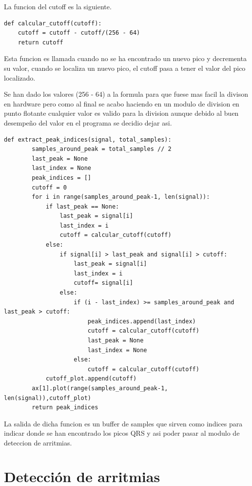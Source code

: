 La funcion del cutoff es la siguiente.
\lstset{language=python, breaklines=true, basicstyle=\footnotesize}
\begin{lstlisting}[frame=single]
def calcular_cutoff(cutoff):
    cutoff = cutoff - cutoff/(256 - 64)
    return cutoff
\end{lstlisting}

Esta funcion es llamada cuando no se ha encontrado un nuevo pico y decrementa su valor, cuando se localiza un
nuevo pico, el cutoff pasa a tener el valor del pico localizado.

Se han dado los valores (256 - 64) a la formula para que fuese mas facil la divison en hardware pero como al final 
se acabo haciendo en un modulo de division en punto flotante cualquier valor es valido para la division aunque debido 
al buen desempeño del valor en el programa se decidio dejar asi.

\lstset{language=python, breaklines=true, basicstyle=\footnotesize}
\begin{lstlisting}[frame=single]
    def extract_peak_indices(signal, total_samples):
        samples_around_peak = total_samples // 2
        last_peak = None
        last_index = None
        peak_indices = []
        cutoff = 0
        for i in range(samples_around_peak-1, len(signal)):
            if last_peak == None:
                last_peak = signal[i]
                last_index = i
                cutoff = calcular_cutoff(cutoff)
            else:
                if signal[i] > last_peak and signal[i] > cutoff:
                    last_peak = signal[i]
                    last_index = i
                    cutoff= signal[i]
                else:
                    if (i - last_index) >= samples_around_peak and last_peak > cutoff:
                        peak_indices.append(last_index)
                        cutoff = calcular_cutoff(cutoff)
                        last_peak = None
                        last_index = None         
                    else:
                        cutoff = calcular_cutoff(cutoff)
            cutoff_plot.append(cutoff)
        ax[1].plot(range(samples_around_peak-1, len(signal)),cutoff_plot)
        return peak_indices
\end{lstlisting}

La salida de dicha funcion es un buffer de samples que sirven como indices para indicar donde se han encontrado
los picos QRS y asi poder pasar al modulo de deteccion de arritmias.

\section{Detección de arritmias}

